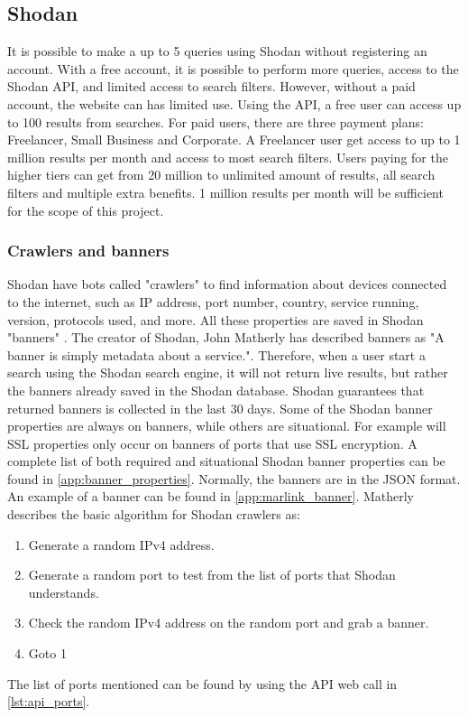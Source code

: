 \subsection{Shodan}\label{sec:shodan}
It is possible to make a up to 5 queries using Shodan without registering an account. 
With a free account, it is possible to perform more queries, access to the Shodan API, and limited access to search filters. However, without a paid account, the website can has limited use.
Using the API, a free user can access up to 100 results from searches. 
For paid users, there are three payment plans: Freelancer, Small Business and Corporate. A Freelancer user get access to up to 1 million results per month and access to most search filters. 
Users paying for the higher tiers can get from 20 million to unlimited amount of results, all search filters and multiple extra benefits. 
1 million results per month will be sufficient for the scope of this project.

\subsubsection{Crawlers and banners}
Shodan have bots called "crawlers" to find information about devices connected to the internet, such as IP address, port number, country, service running, version, protocols used, and more. 
All these properties are saved in Shodan "banners" . The creator of Shodan, John Matherly has described banners as "A banner is simply metadata about a service.". \cite{banner} 
Therefore, when a user start a search using the Shodan search engine, it will not return live results, but rather the banners already saved in the Shodan database. Shodan guarantees that returned banners is collected in the last 30 days.\cite{matherly_guide_to_shodan}
Some of the Shodan banner properties are always on banners, while others are situational. For example will SSL properties only occur on banners of ports that use SSL encryption. A complete list of both required and situational Shodan banner properties can be found in \cref{app:banner_properties}.
Normally, the banners are in the JSON format. An example of a banner can be found in \cref{app:marlink_banner}.
Matherly\cite{matherly_guide_to_shodan} describes the basic algorithm for Shodan crawlers as:
\begin{enumerate}
\setlength\itemsep{0em}
	\item Generate a random IPv4 address. 
	\item Generate a random port to test from the list of ports that Shodan understands.
	\item Check the random IPv4 address on the random port and grab a banner.
	\item Goto 1
\end{enumerate}
The list of ports mentioned can be found by using the API web call in \cref{lst:api_ports}.


